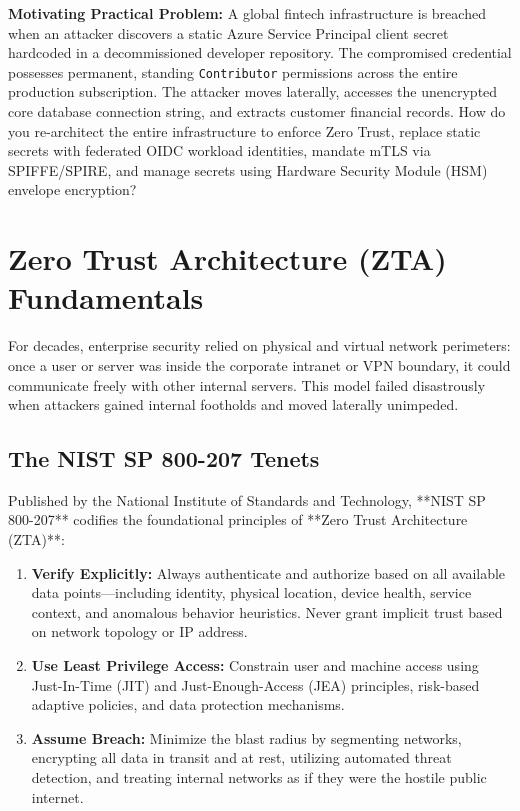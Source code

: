\begin{chaptergoalsbox}
\textbf{Motivating Practical Problem:}
A global fintech infrastructure is breached when an attacker discovers a static Azure Service Principal client secret hardcoded in a decommissioned developer repository. The compromised credential possesses permanent, standing \texttt{Contributor} permissions across the entire production subscription. The attacker moves laterally, accesses the unencrypted core database connection string, and extracts customer financial records. How do you re-architect the entire infrastructure to enforce Zero Trust, replace static secrets with federated OIDC workload identities, mandate mTLS via SPIFFE/SPIRE, and manage secrets using Hardware Security Module (HSM) envelope encryption?
\end{chaptergoalsbox}

\section{Zero Trust Architecture (ZTA) Fundamentals}

For decades, enterprise security relied on physical and virtual network perimeters: once a user or server was inside the corporate intranet or VPN boundary, it could communicate freely with other internal servers. This model failed disastrously when attackers gained internal footholds and moved laterally unimpeded.

\subsection{The NIST SP 800-207 Tenets}
Published by the National Institute of Standards and Technology, **NIST SP 800-207** codifies the foundational principles of **Zero Trust Architecture (ZTA)**:
\begin{enumerate}[leftmargin=15pt]
  \item \textbf{Verify Explicitly:} Always authenticate and authorize based on all available data points---including identity, physical location, device health, service context, and anomalous behavior heuristics. Never grant implicit trust based on network topology or IP address.
  \item \textbf{Use Least Privilege Access:} Constrain user and machine access using Just-In-Time (JIT) and Just-Enough-Access (JEA) principles, risk-based adaptive policies, and data protection mechanisms.
  \item \textbf{Assume Breach:} Minimize the blast radius by segmenting networks, encrypting all data in transit and at rest, utilizing automated threat detection, and treating internal networks as if they were the hostile public internet.
\end{enumerate}

